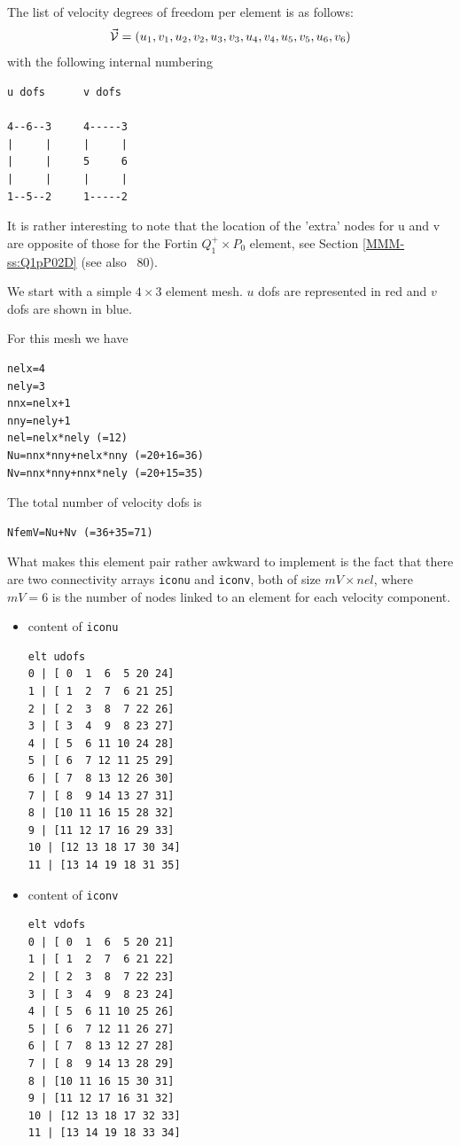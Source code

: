 The list of velocity degrees of freedom per element is as follows:
\[
\vec{\cal V} = (u_1,v_1,u_2,v_2,u_3,v_3,u_4,v_4,u_5,v_5,u_6,v_6)
\]
with the following internal numbering
\begin{verbatim}
u dofs      v dofs

4--6--3     4-----3
|     |     |     |
|     |     5     6
|     |     |     |
1--5--2     1-----2
\end{verbatim}
It is rather interesting to note that the location of the 'extra' 
nodes for u and v are opposite of those for the Fortin $Q_1^+\times P_0$ element, see
Section \ref{MMM-ss:Q1pP02D} (see also \stone~80).

We start with a simple $4\times 3$ element mesh.
$u$ dofs are represented in red and $v$ dofs are shown in blue.





For this mesh we have 

\begin{lstlisting}
nelx=4
nely=3
nnx=nelx+1
nny=nely+1
nel=nelx*nely (=12) 
Nu=nnx*nny+nelx*nny (=20+16=36)
Nv=nnx*nny+nnx*nely (=20+15=35)
\end{lstlisting}

The total number of velocity dofs is 
\begin{lstlisting}
NfemV=Nu+Nv (=36+35=71)
\end{lstlisting}

What makes this element pair rather awkward to implement is the fact that 
there are two connectivity arrays {\tt iconu} and {\tt iconv}, both of size $mV\times nel$, where 
$mV=6$ is the number of nodes linked to an element for each velocity component. 
\begin{itemize}
\item content of {\tt iconu}
\begin{verbatim}
elt udofs 
0 | [ 0  1  6  5 20 24]
1 | [ 1  2  7  6 21 25]
2 | [ 2  3  8  7 22 26]
3 | [ 3  4  9  8 23 27]
4 | [ 5  6 11 10 24 28]
5 | [ 6  7 12 11 25 29]
6 | [ 7  8 13 12 26 30]
7 | [ 8  9 14 13 27 31]
8 | [10 11 16 15 28 32]
9 | [11 12 17 16 29 33]
10 | [12 13 18 17 30 34]
11 | [13 14 19 18 31 35]
\end{verbatim}
\item content of {\tt iconv}
\begin{verbatim}
elt vdofs 
0 | [ 0  1  6  5 20 21]
1 | [ 1  2  7  6 21 22]
2 | [ 2  3  8  7 22 23]
3 | [ 3  4  9  8 23 24]
4 | [ 5  6 11 10 25 26]
5 | [ 6  7 12 11 26 27]
6 | [ 7  8 13 12 27 28]
7 | [ 8  9 14 13 28 29]
8 | [10 11 16 15 30 31]
9 | [11 12 17 16 31 32]
10 | [12 13 18 17 32 33]
11 | [13 14 19 18 33 34]
\end{verbatim}
\end{itemize}

